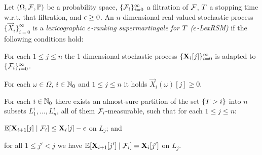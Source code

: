 \begin{definition}
\label{def:lexrsm}
Let $(\Omega,\mathcal{F},\mathbb{P})$ be a probability space, 
$\{\mathcal{F}_i\}_{i=0}^{\infty}$ a filtration of $\mathcal{F}$, $T$ a stopping 
time w.r.t. that filtration, and 
$\epsilon\geq 0$. 
An $n$-dimensional real-valued stochastic process 
$\{\vec{X}_{i}\}_{i=0}^{\infty}$ is a 
\emph{lexicographic $\epsilon$-ranking supermartingale for $T$ 
($\epsilon$-LexRSM)} if the 
following 
conditions hold:
\begin{compactenum}
\item For each $1\leq j \leq n$ the 1-dimensional stochastic process 
$\{\mathbf{X}_{i}[j]\}_{i=0}^{\infty}$ is adapted to 
$\{\mathcal{F}_i\}_{i=0}^{\infty}$.
\item For each $\omega \in \Omega$, $i\in \mathbb{N}_0$ and $1\leq j \leq n$ it holds 
$\vec{X}_i (\omega)[j]\geq {0}$. %
\item For each $i\in \mathbb{N}_0$ there exists an almost-sure partition of the set $\{T>i\}$ into $n$ subsets $L^i_1,\dots,L^i_n$, all of them $\mathcal{F}_i$-measurable, such that for each $1\leq j \leq n$:
\begin{compactitem}
	\item $\mathbb{E}[\mathbf{X}_{i+1}[j]\mid 
	\mathcal{F}_i]\leq\mathbf{X}_{i}[j] - 
	\epsilon$ on $L_j$; and
	\item for all $1 \leq j' < j$ we have $\mathbb{E}[\mathbf{X}_{i+1}[j']\mid 
	\mathcal{F}_i]=\mathbf{X}_{i}[j']$ on $L_{j}$.
\end{compactitem}
\end{compactenum}
\end{definition}

